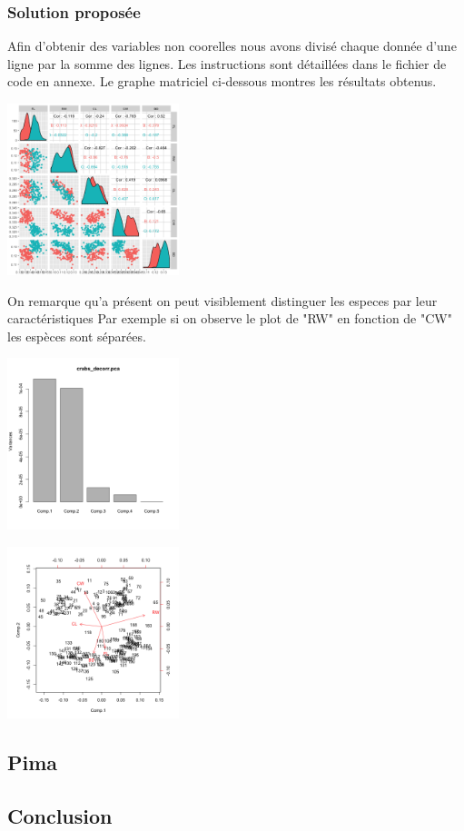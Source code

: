 \documentclass[10pt]{article}
\begin{document}
\subsubsection{Solution proposée}
Afin d'obtenir des variables non coorelles nous avons divisé chaque donnée d'une ligne par la somme des lignes. Les instructions sont détaillées dans le fichier de code en annexe. Le graphe matriciel  ci-dessous montres les résultats obtenus.
\begin{center}
\includegraphics[width=50mm]{Figures/Crabs/matricial_plot_decorr.png}	
\label{fig:crabs_matricial_plot_decorr}
\end{center}
On remarque qu'a présent on peut visiblement distinguer les especes par leur caractéristiques Par exemple si on observe le plot de  "RW" en fonction de "CW" les espèces sont séparées.


	\begin{minipage}{.5\textwidth}
	\centering
	\includegraphics[width=50mm]{Figures/Crabs/decorr_pca_plot.png}
	\label{fig:crabs_pca_plot}
\end{minipage}%
\hspace{0.08\linewidth}
\begin{minipage}{.5\textwidth}
	\centering
	\includegraphics[width=50mm]{Figures/Crabs/decorr_pca_biplot.png}
	\label{fig:crabs_pca_biplot}
\end{minipage}


\subsection{Pima}

\subsection{Conclusion}
\end{document}
